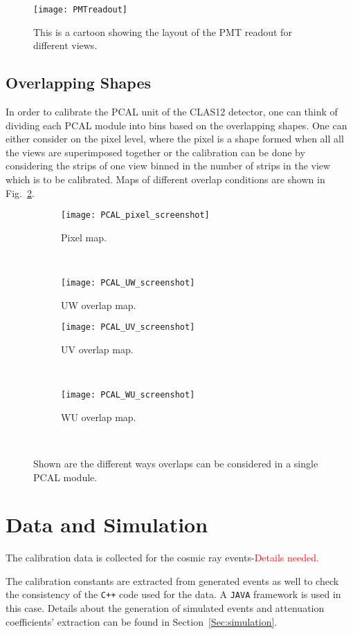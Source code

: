 \begin{figure}[h]
    \centering
    \texttt{[image: PMTreadout]}
    \caption{This is a cartoon showing the layout of the PMT readout for different views.}
    \label{fig:PMTreadout}
\end{figure}
\FloatBarrier

\FloatBarrier
\subsection{Overlapping Shapes}
In order to calibrate the PCAL unit of the CLAS12 detector, one can think of dividing each PCAL module into bins based on the 
overlapping shapes. One can either consider on the pixel level, where the pixel is a shape formed when all 
all the views are superimposed together or the calibration can be done by considering the strips of one 
view binned in the number of strips in the view which is to be calibrated. Maps of different overlap conditions are 
shown in Fig.~\ref{fig:PCAL_overlap}.

\begin{figure}[h]
  \centering
  \begin{subfigure}[b]{0.45\textwidth}
  \texttt{[image: PCAL\_pixel\_screenshot]}
  \caption{Pixel map.}
  \end{subfigure}
  ~
  \begin{subfigure}[b]{0.45\textwidth}
  \texttt{[image: PCAL\_UW\_screenshot]}
  \caption{UW overlap map.}
  \end{subfigure}

  \begin{subfigure}[b]{0.45\textwidth}
  \texttt{[image: PCAL\_UV\_screenshot]}
  \caption{UV overlap map.}
 \end{subfigure}
  ~
  \begin{subfigure}[b]{0.45\textwidth}
  \texttt{[image: PCAL\_WU\_screenshot]}
  \caption{WU overlap map.}
  \end{subfigure}
  ~
  \caption{Shown are the different ways overlaps can be considered in a single PCAL module.}
  \label{fig:PCAL_overlap}
\end{figure}
\FloatBarrier

\section{Data and Simulation}
The calibration data is collected for the cosmic ray events-\textcolor{red}{Details needed.}

The calibration constants are extracted from generated events as well to check the consistency of the \texttt{C++} code used 
for the data. A \texttt{JAVA} framework is used in this case. Details about the generation of simulated events and 
attenuation coefficients' extraction can be found in Section~\ref{Sec:simulation}.
\clearpage

